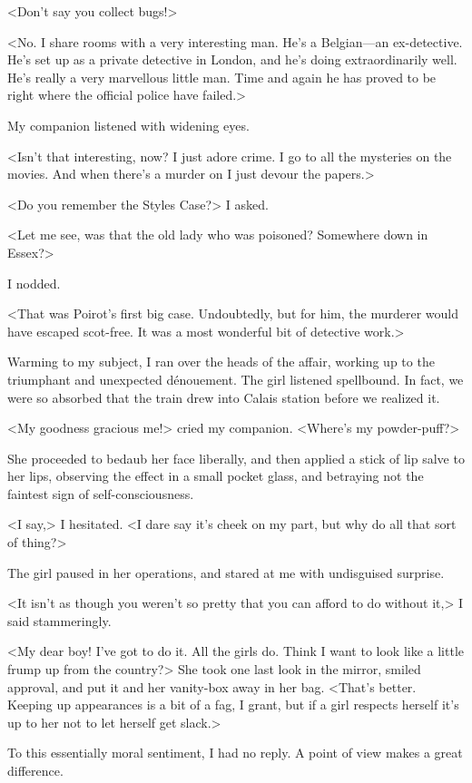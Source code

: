  <Don't say you collect bugs!> 

 <No. I share rooms with a very interesting man. He's a Belgian—an ex-detective. He's set up as a private detective in London, and he's doing extraordinarily well. He's really a very marvellous little man. Time and again he has proved to be right where the official police have failed.> 

 My companion listened with widening eyes. 

 <Isn't that interesting, now? I just adore crime. I go to all the mysteries on the movies. And when there's a murder on I just devour the papers.> 

 <Do you remember the Styles Case?> I asked. 

 <Let me see, was that the old lady who was poisoned? Somewhere down in Essex?> 

 I nodded. 

 <That was Poirot's first big case. Undoubtedly, but for him, the murderer would have escaped scot-free. It was a most wonderful bit of detective work.> 

 Warming to my subject, I ran over the heads of the affair, working up to the triumphant and unexpected dénouement. The girl listened spellbound. In fact, we were so absorbed that the train drew into Calais station before we realized it. 

 <My goodness gracious me!> cried my companion. <Where's my powder-puff?> 

 She proceeded to bedaub her face liberally, and then applied a stick of lip salve to her lips, observing the effect in a small pocket glass, and betraying not the faintest sign of self-consciousness. 

 <I say,> I hesitated. <I dare say it's cheek on my part, but why do all that sort of thing?> 

 The girl paused in her operations, and stared at me with undisguised surprise. 

 <It isn't as though you weren't so pretty that you can afford to do without it,> I said stammeringly. 

 <My dear boy! I've got to do it. All the girls do. Think I want to look like a little frump up from the country?> She took one last look in the mirror, smiled approval, and put it and her vanity-box away in her bag. <That's better. Keeping up appearances is a bit of a fag, I grant, but if a girl respects herself it's up to her not to let herself get slack.> 

 To this essentially moral sentiment, I had no reply. A point of view makes a great difference. 

